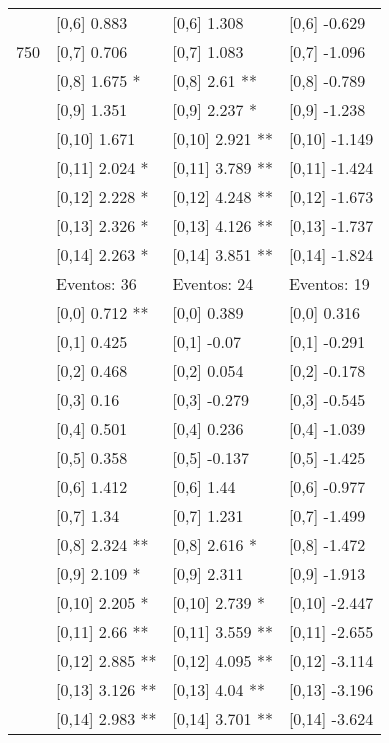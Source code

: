 \begin{table}
\begin{tabular}[t]{llll}
 & {}[0,6] 0.883 & {}[0,6] 1.308 & {}[0,6] -0.629\\
750 & {}[0,7] 0.706 & {}[0,7] 1.083 & {}[0,7] -1.096\\
\addlinespace
 & {}[0,8] 1.675 * & {}[0,8] 2.61 ** & {}[0,8] -0.789\\
 & {}[0,9] 1.351 & {}[0,9] 2.237 * & {}[0,9] -1.238\\
 & {}[0,10] 1.671 & {}[0,10] 2.921 ** & {}[0,10] -1.149\\
 & {}[0,11] 2.024 * & {}[0,11] 3.789 ** & {}[0,11] -1.424\\
 & {}[0,12] 2.228 * & {}[0,12] 4.248 ** & {}[0,12] -1.673\\
\addlinespace
 & {}[0,13] 2.326 * & {}[0,13] 4.126 ** & {}[0,13] -1.737\\
 & {}[0,14] 2.263 * & {}[0,14] 3.851 ** & {}[0,14] -1.824\\
 & Eventos:  36 & Eventos:  24 & Eventos:  19\\
 & {}[0,0] 0.712 ** & {}[0,0] 0.389 & {}[0,0] 0.316\\
 & {}[0,1] 0.425 & {}[0,1] -0.07 & {}[0,1] -0.291\\
\addlinespace
 & {}[0,2] 0.468 & {}[0,2] 0.054 & {}[0,2] -0.178\\
 & {}[0,3] 0.16 & {}[0,3] -0.279 & {}[0,3] -0.545\\
 & {}[0,4] 0.501 & {}[0,4] 0.236 & {}[0,4] -1.039\\
 & {}[0,5] 0.358 & {}[0,5] -0.137 & {}[0,5] -1.425\\
 & {}[0,6] 1.412 & {}[0,6] 1.44 & {}[0,6] -0.977\\
\addlinespace
1000 & {}[0,7] 1.34 & {}[0,7] 1.231 & {}[0,7] -1.499\\
 & {}[0,8] 2.324 ** & {}[0,8] 2.616 * & {}[0,8] -1.472\\
 & {}[0,9] 2.109 * & {}[0,9] 2.311 & {}[0,9] -1.913\\
 & {}[0,10] 2.205 * & {}[0,10] 2.739 * & {}[0,10] -2.447\\
 & {}[0,11] 2.66 ** & {}[0,11] 3.559 ** & {}[0,11] -2.655\\
\addlinespace
 & {}[0,12] 2.885 ** & {}[0,12] 4.095 ** & {}[0,12] -3.114\\
 & {}[0,13] 3.126 ** & {}[0,13] 4.04 ** & {}[0,13] -3.196\\
 & {}[0,14] 2.983 ** & {}[0,14] 3.701 ** & {}[0,14] -3.624\\
\bottomrule
\end{tabular}
\end{table}
